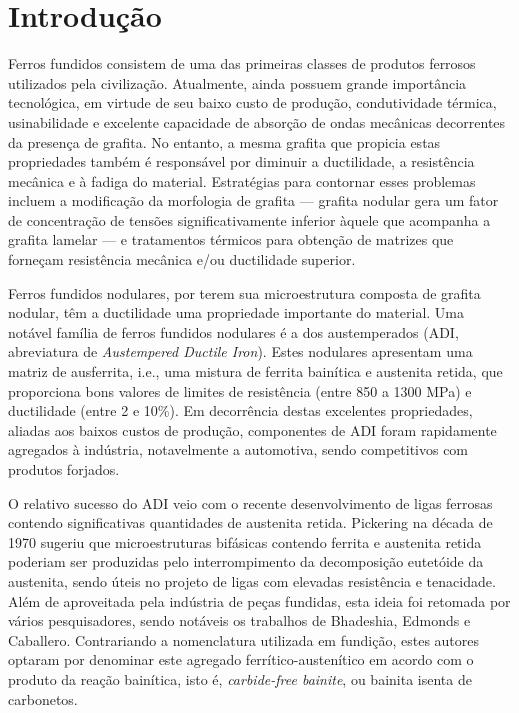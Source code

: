 \chapter{Introdu\c{c}\~{a}o}

Ferros fundidos consistem de uma das primeiras classes de produtos ferrosos utilizados pela civilização. Atualmente, ainda possuem grande importância tecnológica, em virtude de seu baixo custo de produção, condutividade térmica, usinabilidade e excelente capacidade de absorção de ondas mecânicas decorrentes da presença de grafita. No entanto, a mesma grafita que propicia estas propriedades também é responsável por diminuir a ductilidade, a resistência mecânica e à fadiga do material. Estratégias para contornar esses problemas incluem a modificação da morfologia de grafita --- grafita nodular gera um fator de concentração de tensões significativamente inferior àquele que acompanha a grafita lamelar --- e tratamentos térmicos para obtenção de matrizes que forneçam resistência mecânica e/ou ductilidade superior.

Ferros fundidos nodulares, por terem sua microestrutura composta de grafita nodular, têm a ductilidade uma propriedade importante do material. Uma notável família de ferros fundidos nodulares é a dos austemperados (ADI, abreviatura de \textit{Austempered Ductile Iron}). Estes nodulares apresentam uma matriz de ausferrita, i.e., uma mistura de ferrita bainítica e austenita retida, que proporciona bons valores de limites de resistência (entre 850 a 1300 MPa) e ductilidade (entre 2 e 10\%)\cite{Guesser2009}. Em decorrência destas excelentes propriedades, aliadas aos baixos custos de produção, componentes de ADI foram rapidamente agregados à indústria, notavelmente a automotiva, sendo competitivos com produtos forjados\cite{Hayrynen2002}.

O relativo sucesso do ADI veio com o recente desenvolvimento de ligas ferrosas contendo significativas quantidades de austenita retida. Pickering na década de 1970 sugeriu que microestruturas bifásicas contendo ferrita e austenita retida poderiam ser produzidas pelo interrompimento da decomposição eutetóide da austenita, sendo úteis no projeto de ligas com elevadas resistência e tenacidade\cite{Goldenstein2002}. Além de aproveitada pela indústria de peças fundidas, esta ideia foi retomada por vários pesquisadores, sendo notáveis os trabalhos de Bhadeshia, Edmonds e Caballero\cite{Bhadeshia1980a,Caballero2003,Garcia-Mateo2009,GarciaMateo2005}. Contrariando a nomenclatura utilizada em fundição, estes autores optaram por denominar este agregado ferrítico-austenítico em acordo com o produto da reação bainítica, isto é,\textit{ carbide-free bainite}, ou bainita isenta de carbonetos.

